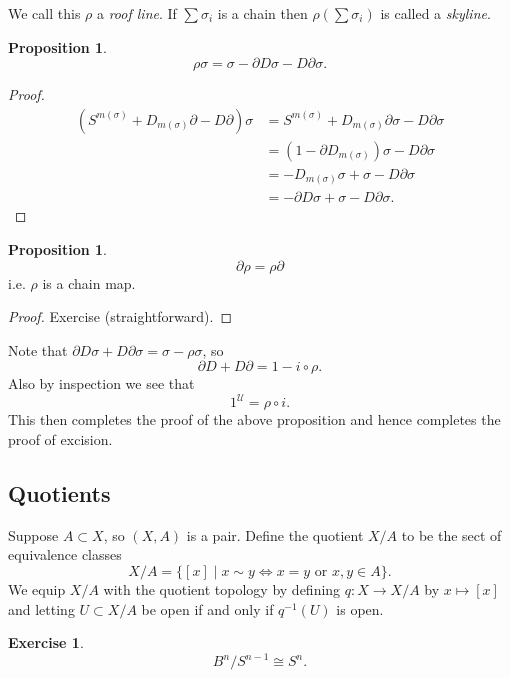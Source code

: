 \documentclass[12pt]{article}
\theoremstyle{definition}
\newtheorem{prop}[thm]{Proposition}
\theoremstyle{definition}
\newtheorem*{exer}{Exercise}
\newcommand{\U}{\mathcal{U}}
\begin{document}
We call this $\rho$ a \emph{roof line}.
If $\sum \sigma_i$ is a chain then $\rho\left(\sum \sigma_i\right)$ is called a \emph{skyline}.

\begin{prop}
\[
\rho\sigma = \sigma - \partial D\sigma - D\partial \sigma.
\]
\end{prop}
\begin{proof}
\begin{align*}
(S^{m(\sigma)}  + D_{m(\sigma)} \partial - D\partial)\sigma &= S^{m(\sigma)} + D_{m(\sigma)} \partial \sigma - D\partial \sigma\\
&= (1 - \partial D_{m(\sigma)}) \sigma - D\partial \sigma \\
&= -D_{m(\sigma)}\sigma + \sigma - D\partial \sigma\\
&= -\partial D \sigma + \sigma - D\partial \sigma.
\end{align*}
\end{proof}

\begin{prop}
\[
\partial \rho = \rho \partial
\]
i.e. $\rho$ is a chain map.
\end{prop}
\begin{proof}
Exercise (straightforward).
\end{proof}

Note that $\partial D \sigma + D \partial \sigma = \sigma - \rho \sigma$, so
\[
\partial D + D\partial = 1 - i\circ\rho.
\]
Also by inspection we see that 
\[
1^{\U} = \rho \circ i.
\]
This then completes the proof of the above proposition and hence completes the proof of excision.

\subsection{Quotients}
Suppose $A \subset X$, so $(X,A)$ is a pair.
Define the quotient $X/A$ to be the sect of equivalence classes 
\[
X/A = \{[x]\mid x\sim y \iff x=y \text{ or } x,y\in A\}.
\]
We equip $X/A$ with the quotient topology by defining $q\colon X\to X/A$ by $x\mapsto [x]$ and letting $U\subset X/A$ be open if and only if $q^{-1}(U)$ is open.

\begin{exer}
\[
B^n/S^{n-1}\cong S^n.
\]
\end{exer}
\end{document}
